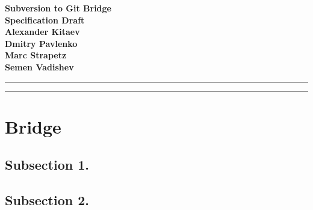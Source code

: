 \documentclass[aps,%
12pt,%
final,%
oneside,
onecolumn,%
superscriptaddress,%
centertags]{article} %
\begin{document}
\begin{titlepage}
\begin{center}

\textbf{\LARGE Subversion to Git Bridge} \\[1.0cm]
\textbf{\Large Specification Draft} \\[2.0cm]

\textbf{Alexander Kitaev} \\[1.0cm]
\textbf{Dmitry Pavlenko} \\[1.0cm]
\textbf{Marc Strapetz} \\[1.0cm]
\textbf{Semen Vadishev} \\[1.0cm]

\end{center}
\end{titlepage}
\topmargin=-10pt
\setcounter{page}{2}
\newpage
\hrule
\tableofcontents
\newpage
\hrule
\section{Bridge}
\subsection{Subsection 1.}
\subsection{Subsection 2.}
\end{document}
